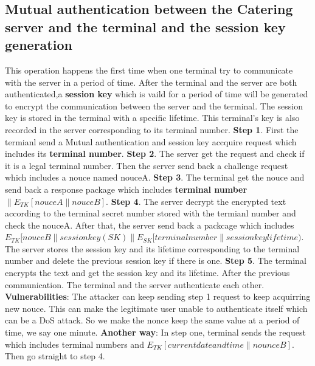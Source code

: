 \documentclass{article}
\begin{document}
        \subsection*{Mutual authentication between the Catering server and the terminal and the session key generation}
This operation happens the first time when one terminal try to communicate with the server in a period of time. 
        After the terminal and the server are both authenticated,a \textbf{session key} which is vaild for a period of time will be generated to encrypt the communication between the server and the terminal.
         The session key is stored in the terminal with a specific lifetime.
This terminal's key is also recorded in the server corresponding to its terminal number. 
        \newline
\textbf{Step 1}. First the termianl send a Mutual authentication and session key accquire request which includes its \textbf{terminal number}.
        \newline
\textbf{Step 2}. The server get the request and check if it is a legal terminal number.
Then the server send back a challenge request which includes a nouce named nouceA.
        \newline
\textbf{Step 3}. The terminal get the nouce and send back a response package which includes \textbf{  terminal number $\parallel E_{TK}[nouceA \parallel nouceB]$}. 
        \newline
\textbf{Step 4}. The server decrypt the encrypted text according to the terminal secret number stored with the termianl number and check the nouceA. 
After that, the server send back a packcage which includes  $E_{TK}[nouceB \parallel  session key(SK) \parallel E_{SK}[terminal number \parallel session key lifetime )$. 
The server stores the session key and its lifetime corresponding to the terminal number and delete the previous session key if there is one.  
        \newline
\textbf{Step 5}. The terminal encrypts the text and get the session key and its lifetime. 
After the previous communication.
The terminal and the server authenticate each other.
        \newline
\textbf{Vulnerabilities}: The attacker can keep sending  step 1 request to keep acquirring new nouce. 
This can make the legitimate user unable to authenticate itself which can be a DoS attack. 
So we make the nonce keep the same value at a period of time, we say one minute.
        \newline
\textbf{Another way}:
In step one, terminal sends the request which includes terminal numbers and $E_{TK}[current date and time \parallel nounceB]$. 
Then go straight to step 4.
    
\end{document}
